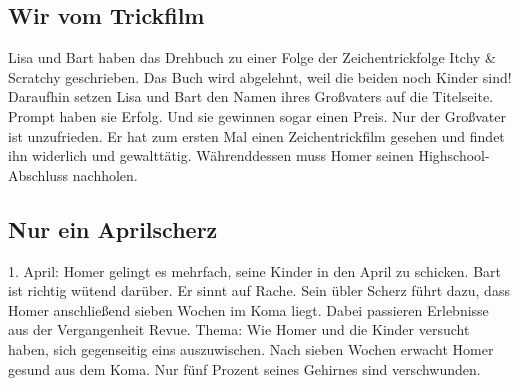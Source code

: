 
	
\subsection{Wir vom Trickfilm}\label{9F16}
Lisa und Bart haben das Drehbuch zu einer Folge der Zeichentrickfolge Itchy \& Scratchy geschrieben. Das Buch wird abgelehnt, weil die beiden noch Kinder sind! Daraufhin setzen Lisa und Bart den Namen ihres Großvaters auf die Titelseite. Prompt haben sie Erfolg. Und sie gewinnen sogar einen Preis. Nur der Großvater ist unzufrieden. Er hat zum ersten Mal einen Zeichentrickfilm gesehen und findet ihn widerlich und gewalttätig. Währenddessen muss Homer seinen Highschool-Abschluss nachholen.

	
\subsection{Nur ein Aprilscherz}\label{9F17}
1. April: Homer gelingt es mehrfach, seine Kinder in den April zu schicken. Bart ist richtig wütend darüber. Er sinnt auf Rache. Sein übler Scherz führt dazu, dass Homer anschließend sieben Wochen im Koma liegt. Dabei passieren Erlebnisse aus der Vergangenheit Revue. Thema: Wie Homer und die Kinder versucht haben, sich gegenseitig eins auszuwischen. Nach sieben Wochen erwacht Homer gesund aus dem Koma. Nur fünf Prozent seines Gehirnes sind verschwunden.

